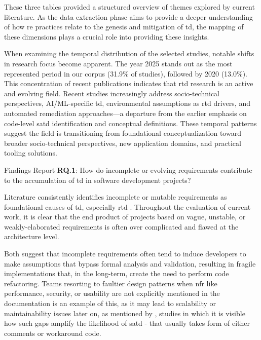 \documentclass[12pt,reqno, twoside]{amsbook}
\makeatletter
\def\subsubsection{\@startsection{subsubsection}{3}%
      \z@{.5\linespacing\@plus.7\linespacing}{.25\linespacing}%
      {\normalfont\bfseries\flushleft}}
\theoremstyle{plain}
\numberwithin{equation}{chapter}
\numberwithin{section}{chapter}
\makeatother
\begin{document}
\noindent These three tables provided a structured overview of themes explored by current literature. As the data extraction phase aims to provide a deeper understanding of how \gls{re} practices relate to the genesis and mitigation of \gls{td}, the mapping of these dimensions plays a crucial role into providing these insights.

\noindent When examining the temporal distribution of the selected studies, notable shifts in research focus become apparent. The year 2025 stands out as the most represented period in our corpus (31.9\% of studies), followed by 2020 (13.0\%). This concentration of recent publications indicates that \gls{rtd} research is an active and evolving field. Recent studies increasingly address socio-technical perspectives, AI/ML-specific \gls{td}, environmental assumptions as \gls{rtd} drivers, and automated remediation approaches—a departure from the earlier emphasis on code-level \gls{satd} identification and conceptual definitions. These temporal patterns suggest the field is transitioning from foundational conceptualization toward broader socio-technical perspectives, new application domains, and practical tooling solutions.

\subsubsection{Findings Report}
\noindent\textbf{RQ.1}: How do incomplete or evolving requirements contribute to the accumulation of \gls{td} in software development projects?\par

Literature consistently identifies incomplete or mutable requirements as foundational causes of \gls{td}, especially \gls{rtd} \parencite{Melo2022, Waltersdorfer2020}. Throughout the evaluation of current work, it is clear that the end product of projects based on vague, unstable, or weakly-elaborated requirements is often over complicated and flawed at the architecture level.

Both \textcite{Seyff2018, Rios2020} suggest that incomplete requirements often tend to induce developers to make assumptions that bypass formal analysis and validation, resulting in fragile implementations that, in the long-term, create the need to perform code refactoring. Teams resorting to faultier design patterns when \gls{nfr} like performance, security, or usability are not explicitly mentioned in the documentation is an example of this, as it may lead to scalability or maintainability issues later on, as mentioned by \textcite{Farias2020, Wattanakriengkrai2018}, studies in which it is visible how such gaps amplify the likelihood of \gls{satd} - that usually takes form of either comments or workaround code.
\end{document}

